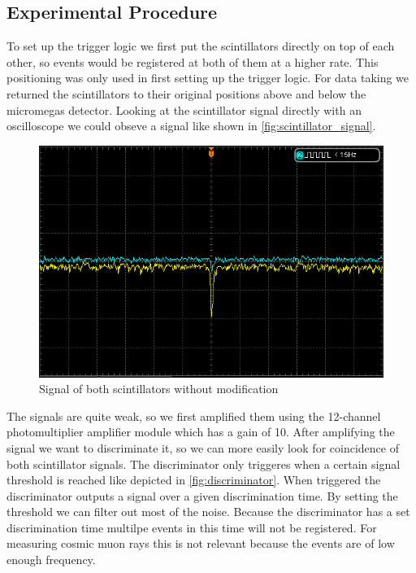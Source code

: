 \documentclass[sn-mathphys-num,iicol]{sn-jnl}
\theoremstyle{thmstyleone}
\theoremstyle{thmstyletwo}
\theoremstyle{thmstylethree}
\begin{document}
\subsection{Experimental Procedure}
To set up the trigger logic we first put the scintillators directly on top of each other, so events would be registered at both of them at a higher rate.
This positioning was only used in first setting up the trigger logic.
For data taking we returned the scintillators to their original positions above and below the micromegas detector.
Looking at the scintillator signal directly with an oscilloscope we could obseve a signal like shown in \autoref{fig:scintillator_signal}.

\begin{figure}
  \includegraphics[width=\linewidth]{figures/DS1Z_QuickPrint5_cropped.png}
  \caption{Signal of both scintillators without modification}
  \label{fig:scintillator_signal}
\end{figure}

The signals are quite weak, so we first amplified them using the 12-channel photomultiplier amplifier module which has a gain of 10.
After amplifying the signal we want to discriminate it, so we can more easily look for coincidence of both scintillator signals.
The discriminator only triggeres when a certain signal threshold is reached like depicted in \autoref{fig:discriminator}. 
When triggered the discriminator outputs a signal over a given discrimination time.
By setting the threshold we can filter out most of the noise.
Because the discriminator has a set discrimination time multilpe events in this time will not be registered. 
For measuring cosmic muon rays this is not relevant because the events are of low enough frequency.
\end{document}

